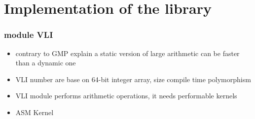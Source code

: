 \documentclass[oribibl]{llncs2e/llncs}
\begin{document}





\section{Implementation of the library}
\subsubsection{module VLI}
\begin{itemize}
\item contrary to GMP  explain a static version of large arithmetic can be faster than a dynamic one
\item   VLI number are base on 64-bit integer array, size compile time polymorphism 
\item VLI module performs arithmetic operations, it needs performable kernels
\item ASM Kernel 


\end{itemize}
\end{document}
